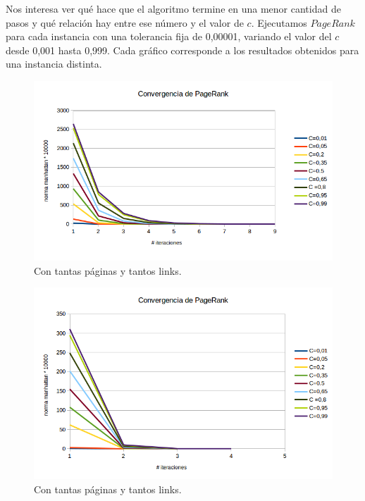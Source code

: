 Nos interesa ver qué hace que el algoritmo termine en una menor cantidad de pasos y qué relación hay entre ese número y el valor de $c$. Ejecutamos $PageRank$ para cada instancia con una tolerancia fija de 0,00001, variando el valor del $c$ desde 0,001 hasta 0,999. Cada gráfico corresponde a los resultados obtenidos para una instancia distinta.\\



\begin{figure}[h]
  \includegraphics[scale= 0.6]{imagenes/convergencia2.png}
   \caption{Con tantas páginas y tantos links.}
  \label{fig:img1}
\end{figure}


\newpage

\begin{figure}
  \vspace{-20pt}
  \begin{center}
    \includegraphics[scale= 0.6]{imagenes/convergencia3.png}
  \end{center}
  \vspace{-20pt}
   \caption{Con tantas páginas y tantos links.}
  \vspace{-10pt}
  \label{fig:img1}
\end{figure}

